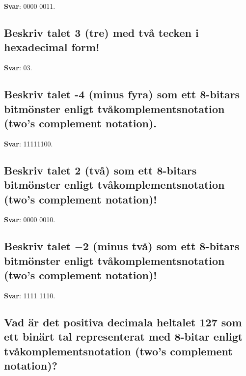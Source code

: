 \documentclass[a4paper,11pt,oneside]{article}
\begin{document}
\begin{sloppypar}
\label{q:366:sa:sv:True}

\textbf{Svar}: 0000 0011.



\subsection{Beskriv talet 3 (tre) med tv\r{a} tecken i hexadecimal form!}

\label{q:367:sa:sv:True}

\textbf{Svar}: 03.



\subsection{Beskriv talet -4 (minus fyra) som ett 8-bitars bitm\"onster enligt tv\r{a}komplementsnotation (two{\textquoteright}s complement notation).}

\label{q:368:sa:sv:True}

\textbf{Svar}: 11111100.



\subsection{Beskriv talet 2 (tv\r{a}) som ett 8-bitars bitm\"onster enligt tv\r{a}komplementsnotation (two{\textquoteright}s complement notation)!}

\label{q:369:sa:sv:True}

\textbf{Svar}: 0000 0010.



\subsection{Beskriv talet \ensuremath{-}2 (minus tv\r{a}) som ett 8-bitars bitm\"onster enligt tv\r{a}komplementsnotation (two{\textquoteright}s complement notation)!}

\label{q:370:sa:sv:True}

\textbf{Svar}: 1111 1110.



\subsection{Vad \"ar det positiva decimala heltalet 127 som ett bin\"art tal representerat med 8-bitar enligt tv\r{a}komplementsnotation (two{\textquoteright}s complement notation)?}

\label{q:371:sa:sv:True}


\end{sloppypar}
\end{document}
